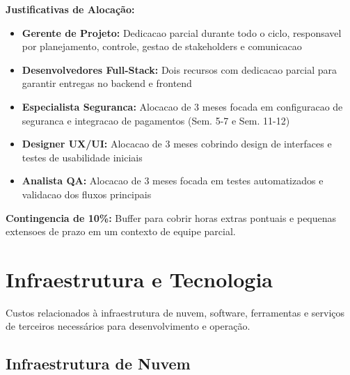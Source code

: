 \textbf{Justificativas de Alocação:}

\begin{itemize}
    \item \textbf{Gerente de Projeto:} Dedicacao parcial durante todo o ciclo, responsavel por planejamento, controle, gestao de stakeholders e comunicacao

    \item \textbf{Desenvolvedores Full-Stack:} Dois recursos com dedicacao parcial para garantir entregas no backend e frontend

    \item \textbf{Especialista Seguranca:} Alocacao de 3 meses focada em configuracao de seguranca e integracao de pagamentos (Sem. 5-7 e Sem. 11-12)

    \item \textbf{Designer UX/UI:} Alocacao de 3 meses cobrindo design de interfaces e testes de usabilidade iniciais

    \item \textbf{Analista QA:} Alocacao de 3 meses focada em testes automatizados e validacao dos fluxos principais
\end{itemize}

\textbf{Contingencia de 10\%:} Buffer para cobrir horas extras pontuais e pequenas extensoes de prazo em um contexto de equipe parcial.

\section{Infraestrutura e Tecnologia}

Custos relacionados à infraestrutura de nuvem, software, ferramentas e serviços de terceiros necessários para desenvolvimento e operação.

\subsection{Infraestrutura de Nuvem}

